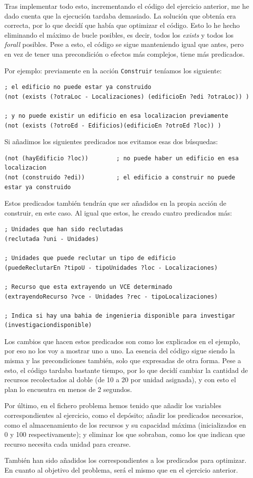 \documentclass[11pt,a4paper]{article}
\begin{document}
Tras implementar todo esto, incrementando el código del ejercicio anterior, me he dado cuenta que la ejecución tardaba demasiado.
La solución que obtenía era correcta, por lo que decidí que había que optimizar el código. Esto lo he hecho eliminando el máximo
de bucle posibles, es decir, todos los \textit{exists} y todos los \textit{forall} posibles. Pese a esto, el código se sigue
manteniendo igual que antes, pero en vez de tener una precondición o efectos más complejos, tiene más predicados.

Por ejemplo: previamente en la acción \texttt{Construir} teníamos los siguiente:
\begin{lstlisting}
; el edificio no puede estar ya construido
(not (exists (?otraLoc - Localizaciones) (edificioEn ?edi ?otraLoc)) )

; y no puede existir un edificio en esa localizacion previamente
(not (exists (?otroEd - Edificios)(edificioEn ?otroEd ?loc)) )
\end{lstlisting}

Si añadimos los siguientes predicados nos evitamos esas dos búsquedas:
\begin{lstlisting}
(not (hayEdificio ?loc))        ; no puede haber un edificio en esa localizacion
(not (construido ?edi))         ; el edificio a construir no puede estar ya construido
\end{lstlisting}

Estos predicados también tendrán que ser añadidos en la propia acción de construir, en este caso. Al igual que estos, he creado
cuatro predicados más:
\begin{lstlisting}
; Unidades que han sido reclutadas
(reclutada ?uni - Unidades)

; Unidades que puede reclutar un tipo de edificio
(puedeReclutarEn ?tipoU - tipoUnidades ?loc - Localizaciones)

; Recurso que esta extrayendo un VCE determinado
(extrayendoRecurso ?vce - Unidades ?rec - tipoLocalizaciones)

; Indica si hay una bahia de ingenieria disponible para investigar
(investigaciondisponible)
\end{lstlisting}

Los cambios que hacen estos predicados son como los explicados en el ejemplo, por eso no los voy a mostrar uno a uno. La esencia
del código sigue siendo la misma y las precondiciones también, solo que expresadas de otra forma. Pese a esto, el código tardaba
bastante tiempo, por lo que decidí cambiar la cantidad de recursos recolectados al doble (de 10 a 20 por unidad asignada), y
con esto el plan lo encuentra en menos de 2 segundos.

Por último, en el fichero problema hemos tenido que añadir los variables correspondientes al ejercicio, como el depósito; añadir
los predicados necesarios, como el almacenamiento de los recursos y su capacidad máxima (inicializados en 0 y 100 respectivamente);
y eliminar los que sobraban, como los que indican que recurso necesita cada unidad para crearse.

También han sido añadidos los correspondientes a los predicados para optimizar. En cuanto al objetivo del problema, será el mismo
que en el ejercicio anterior.
\end{document}
